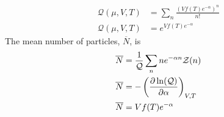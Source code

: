 \documentclass[]{book}
\begin{document}
\begin{enumerate}[1)]
\begin{equation}
\begin{split}
\mathcal{Q}(\mu, V, T) & = \sum_{n} \frac{\left(V f(T)e^{-\alpha} \right)^n}{n!}\\
\mathcal{Q}(\mu, V, T) & = e^{Vf(T) e^{-\alpha}}
\end{split}
\end{equation}
The mean number of particles, $\overline{N}$, is
\begin{equation}
\begin{split}
\overline{N} & = \frac{1}{\mathcal{Q}} \sum_{n} n e^{-\alpha n}\mathcal{Z}(n) \\
\overline{N} & = - \left( \pdv{\ln(\mathcal{Q})}{\alpha}\right)_{V,T} \\
\overline{N} & = Vf(T)e^{-\alpha} \\
\end{split}
\end{equation}


\end{enumerate}
\end{document}
